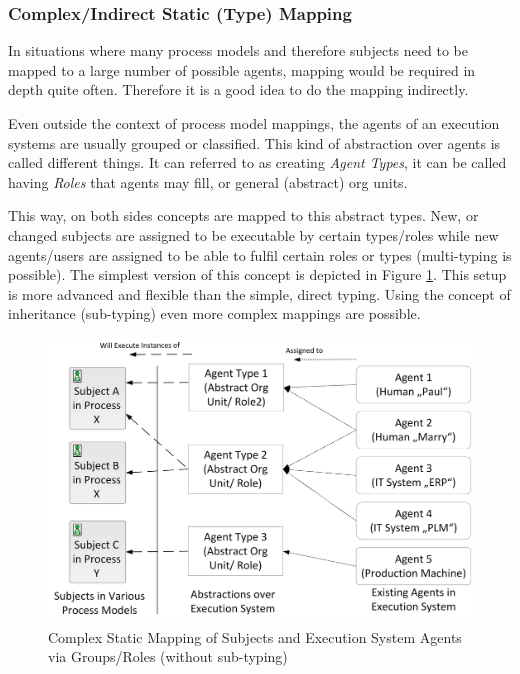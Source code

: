 \subsubsection{Complex/Indirect Static (Type) Mapping}

In situations where many process models and therefore subjects need to be mapped to a large number of possible agents, mapping would be required in depth quite often. Therefore it is a good idea to do the mapping indirectly. 

Even outside the context of process model mappings, the agents of an execution systems are usually grouped or classified. This kind of abstraction over agents is called different things. It can referred to as creating \textit{Agent Types}, it can be called having \textit{Roles} that agents may fill, or general (abstract) org units. 

This way, on both sides concepts are mapped to this abstract types. New, or changed subjects are assigned to be executable by certain types/roles while new agents/users are assigned to be able to fulfil certain roles or types (multi-typing is possible). The simplest version of this concept is depicted in Figure \ref{fig:complexStaticMapping}. This setup is more advanced and flexible than the simple, direct typing. Using the concept of inheritance (sub-typing) even more complex mappings are possible.

\begin{figure}[htbp]
	\centering
	\includegraphics[width=0.8\linewidth]{Figures/Implementation/ComplexAbsoluteMapping.png}
	\caption[Complex Static Mapping of Subjects and Execution System Agents via Groups/Roles (without sub-typing)]{Complex Static Mapping of Subjects and Execution System Agents via Groups/Roles (without sub-typing)}
	\label{fig:complexStaticMapping}
\end{figure}

